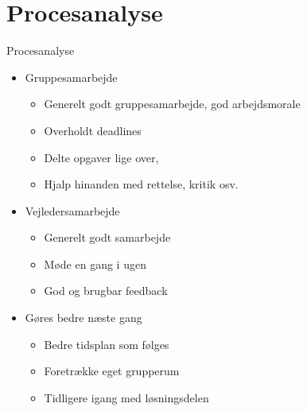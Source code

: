 \section{Procesanalyse}
\begin{frame}{Procesanalyse}{}
\begin{itemize}
\item Gruppesamarbejde
\begin{itemize}
\item Generelt godt gruppesamarbejde, god arbejdsmorale
\item Overholdt deadlines
\item Delte opgaver lige over, 
\item Hjalp hinanden med rettelse, kritik osv.
\end{itemize}
\item Vejledersamarbejde
\begin{itemize}
\item Generelt godt samarbejde
\item Møde en gang i ugen
\item God og brugbar feedback
\end{itemize}
\item Gøres bedre næste gang
\begin{itemize}
\item Bedre tidsplan som følges
\item Foretrække eget grupperum
\item Tidligere igang med løsningsdelen
\end{itemize}
\end{itemize}
\end{frame}